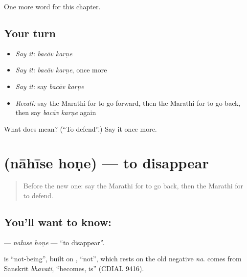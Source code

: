 \begin{grammarlens}[title={What you've built}]
One more word for this chapter.
\end{grammarlens}

\subsection*{Your turn}
\begin{itemize}
\raggedright
  \item \emph{Say it:} \emph{bacāv karṇe}
  \item \emph{Say it:} \emph{bacāv karṇe}, once more
  \item \emph{Say it:} say \emph{bacāv karṇe}
  \item \emph{Recall:} say the Marathi for to go forward, then the Marathi for to go back, then say \emph{bacāv karṇe} again
\end{itemize}

\begin{tcolorbox}[breakable,colback=teal!4,colframe=teal!35!black,title={Before you move on}]
What does   mean? (\textquotedblleft{}To defend\textquotedblright{}.) Say it once more.
\end{tcolorbox}
\section[\texorpdfstring{\mr{नाहीसे} \mr{होणे} (nāhīse hoṇe)}{नाहीसे होणे (nāhīse hoṇe)}]{  (nāhīse hoṇe) — to disappear}

\label{lesson:MR-C228-nahise-hone}



\begin{quote}
Before the new one: say the Marathi for to go back, then the Marathi for to defend.
\end{quote}

\subsection*{You'll want to know:  }
\textbf{ } — \emph{nāhīse hoṇe} — \textquotedblleft{}to disappear\textquotedblright{}.

\begin{cousinweb}
\textbf{} is \textquotedblleft{}not-being\textquotedblright{}, built on \textbf{}, \textquotedblleft{}not\textquotedblright{}, which rests on the old negative \emph{na}. \textbf{} comes from Sanskrit \emph{bhavati}, \textquotedblleft{}becomes, is\textquotedblright{} (CDIAL 9416).
\end{cousinweb}

